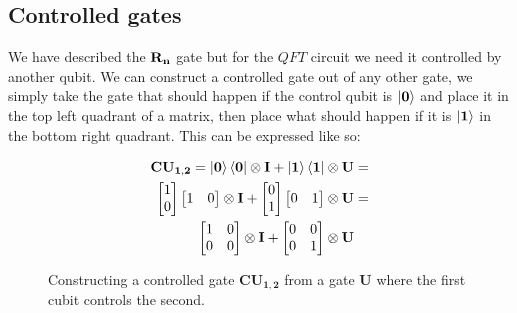 \subsection{Controlled gates}
\newcommand{\qtcr}[1]{\mathbf{CR_{#1}}}
We have described the $\mathbf{R_{n}}$ gate but for the $QFT$ circuit we need it controlled by another qubit. We can construct a controlled gate out of any other gate, we simply take the gate that should happen if the control qubit is $\ket{\mathbf{0}}$ and place it in the top left quadrant of a matrix, then place what should happen if it is $\ket{\mathbf{1}}$ in the bottom right quadrant.  
This can be expressed like so: 
\begin{figure}[H]
    \begin{align*}
        \mathbf{CU_{1,2}}=\ket{\mathbf{0}}\bra{\mathbf{0}}\otimes\mathbf{I} + \ket{\mathbf{1}}\bra{\mathbf{1}}\otimes\mathbf{U}&=\\
        \begin{bmatrix}
            1 \\
            0 \\
        \end{bmatrix}
        \begin{bmatrix}
            1 & 0 \\
        \end{bmatrix}
        \otimes\mathbf{I} + 
        \begin{bmatrix}
            0 \\
            1 \\
        \end{bmatrix}
        \begin{bmatrix}
            0 & 1 \\
        \end{bmatrix}
        \otimes\mathbf{U}&=\\
        \begin{bmatrix}
            1 & 0 \\
            0 & 0 \\
        \end{bmatrix}
        \otimes\mathbf{I} + 
        \begin{bmatrix}
            0 & 0 \\
            0 & 1 \\
        \end{bmatrix}
        \otimes\mathbf{U}& 
    \end{align*}
    \caption{Constructing a controlled gate $\mathbf{CU_{1,2}}$ from a gate $\mathbf{U}$ where the first cubit controls the second. }
    \label{fig:CU1}
\end{figure}
